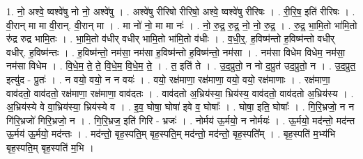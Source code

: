 \documentclass[17pt]{extarticle}
\begin{document}
1. नो॒ अश्वे॒ ष्वश्वे॑षु नो नो॒ अश्वे॑षु । . अश्वे॑षु रीरिषो रीरिषो॒ अश्वे॒ ष्वश्वे॑षु रीरिषः । . री॒रि॒ष॒ इति॑ रीरिषः । . वी॒रान् मा मा वी॒रान्. वी॒रान् मा । . मा नो॑ नो॒ मा मा नः॑ । . नो॒ रु॒द्र॒ रु॒द्र॒ नो॒ नो॒ रु॒द्र॒ । . रु॒द्र॒ भा॒मि॒तो भा॑मि॒तो रु॑द्र रुद्र भामि॒तः । . भा॒मि॒तो व॑धीर् वधीर् भामि॒तो भा॑मि॒तो व॑धीः । . व॒धी॒र्॒. ह॒विष्म॑न्तो ह॒विष्म॑न्तो वधीर् वधीर्. ह॒विष्म॑न्तः । . ह॒विष्म॑न्तो॒ नम॑सा॒ नम॑सा ह॒विष्म॑न्तो ह॒विष्म॑न्तो॒ नम॑सा । . नम॑सा विधेम विधेम॒ नम॑सा॒ नम॑सा विधेम । . वि॒धे॒म॒ ते॒ ते॒ वि॒धे॒म॒ वि॒धे॒म॒ ते॒ । . त॒ इति॑ ते । . उ॒द॒प्रुतो॒ न नो द॒प्रुत॑ उद॒प्रुतो॒ न । . उ॒द॒प्रुत॒ इत्यु॑द - प्रुतः॑ । . न वयो॒ वयो॒ न न वयः॑ । . वयो॒ रक्ष॑माणा॒ रक्ष॑माणा॒ वयो॒ वयो॒ रक्ष॑माणाः । . रक्ष॑माणा॒ वाव॑दतो॒ वाव॑दतो॒ रक्ष॑माणा॒ रक्ष॑माणा॒ वाव॑दतः । . वाव॑दतो अ॒भ्रिय॑स्या॒ भ्रिय॑स्य॒ वाव॑दतो॒ वाव॑दतो अ॒भ्रिय॑स्य । . अ॒भ्रिय॑स्ये वे वा॒भ्रिय॑स्या॒ भ्रिय॑स्ये व । . इ॒व॒ घोषा॒ घोषा॑ इवे व॒ घोषाः᳚ । . घोषा॒ इति॒ घोषाः᳚ । . गि॒रि॒भ्रजो॒ न न गि॑रि॒भ्रजो॑ गिरि॒भ्रजो॒ न । . गि॒रि॒भ्रज॒ इति॑ गिरि - भ्रजः॑ । . नोर्मय॑ ऊ॒र्मयो॒ न नोर्मयः॑ । . ऊ॒र्मयो॒ मद॑न्तो॒ मद॑न्त ऊ॒र्मय॑ ऊ॒र्मयो॒ मद॑न्तः । . मद॑न्तो॒ बृह॒स्पति॒म् बृह॒स्पति॒म् मद॑न्तो॒ मद॑न्तो॒ बृह॒स्पति᳚म् । . बृह॒स्पति॑ म॒भ्य॑भि बृह॒स्पति॒म् बृह॒स्पति॑ म॒भि । \newline
\end{document}
